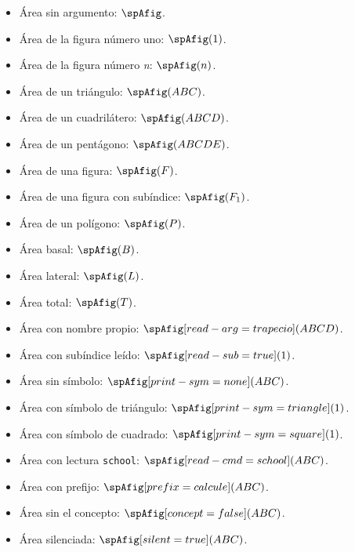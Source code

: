 \documentclass{article}
\begin{document}
\begin{itemize}
  \item Área sin argumento: $\spAfig$.
  \item Área de la figura número uno: $\spAfig(1)$.
  \item Área de la figura número \emph{n}: $\spAfig(n)$.
  \item Área de un triángulo: $\spAfig(ABC)$.
  \item Área de un cuadrilátero: $\spAfig(ABCD)$.
  \item Área de un pentágono: $\spAfig(ABCDE)$.
  \item Área de una figura: $\spAfig(F)$.
  \item Área de una figura con subíndice: $\spAfig(F_{1})$.
  \item Área de un polígono: $\spAfig(P)$.
  \item Área basal: $\spAfig(B)$.
  \item Área lateral: $\spAfig(L)$.
  \item Área total: $\spAfig(T)$.
  \item Área con nombre propio: $\spAfig[read-arg={trapecio}](ABCD)$.
  \item Área con subíndice leído: $\spAfig[read-sub=true](1)$.
  \item Área sin símbolo: $\spAfig[print-sym=none](ABC)$.
  \item Área con símbolo de triángulo: $\spAfig[print-sym=triangle](1)$.
  \item Área con símbolo de cuadrado: $\spAfig[print-sym=square](1)$.
  \item Área con lectura \texttt{school}: $\spAfig[read-cmd=school](ABC)$.
  \item Área con prefijo: $\spAfig[prefix={calcule}](ABC)$.
  \item Área sin el concepto: $\spAfig[concept=false](ABC)$.
  \item Área silenciada: $\spAfig[silent=true](ABC)$.

\end{itemize}
\end{document}
